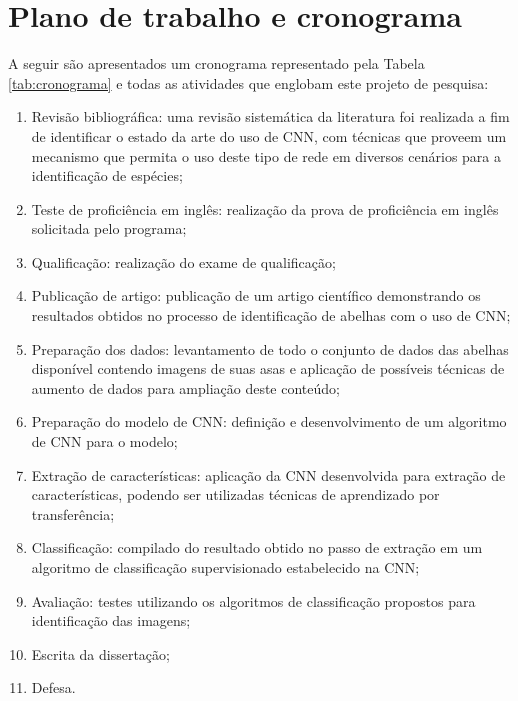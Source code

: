 \documentclass[
	12pt,				%
	oneside,			%
	a4paper,			%
	english,			%
	brazil				%
	]{abntex2ppgsi}
\begin{document}
\section{Plano de trabalho e cronograma}
A seguir são apresentados um cronograma representado pela Tabela \ref{tab:cronograma} e todas as atividades que englobam este projeto de pesquisa:

\begin{enumerate}
  \item Revisão bibliográfica: uma revisão sistemática da literatura foi realizada a fim de identificar o estado da arte do uso de CNN, com técnicas que proveem um mecanismo que permita o uso deste tipo de rede em diversos cenários para a identificação de espécies;
  \item Teste de proficiência em inglês: realização da prova de proficiência em inglês solicitada pelo programa;
  \item Qualificação: realização do exame de qualificação;
  \item Publicação de artigo: publicação de um artigo científico demonstrando os resultados obtidos no processo de identificação de abelhas com o uso de CNN;
  \item Preparação dos dados: levantamento de todo o conjunto de dados das abelhas disponível contendo imagens de suas asas e aplicação de possíveis técnicas de aumento de dados para ampliação deste conteúdo;
  \item Preparação do modelo de CNN: definição e desenvolvimento de um algoritmo de CNN para o modelo;
  \item Extração de características: aplicação da CNN desenvolvida para extração de características, podendo ser utilizadas técnicas de aprendizado por transferência;
  \item Classificação: compilado do resultado obtido no passo de extração em um algoritmo de classificação supervisionado estabelecido na CNN;
  \item Avaliação: testes utilizando os algoritmos de classificação propostos para identificação das imagens;
  \item Escrita da dissertação;
  \item Defesa.
\end{enumerate}
\end{document}
